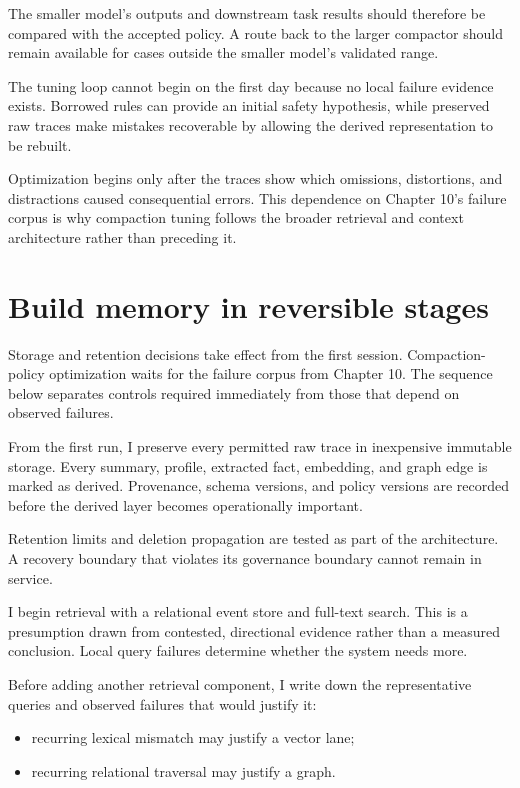 The smaller model's outputs and downstream task results should therefore be compared with the accepted policy. A route back to the larger compactor should remain available for cases outside the smaller model's validated range.

The tuning loop cannot begin on the first day because no local failure evidence exists. Borrowed rules can provide an initial safety hypothesis, while preserved raw traces make mistakes recoverable by allowing the derived representation to be rebuilt.

Optimization begins only after the traces show which omissions, distortions, and distractions caused consequential errors. This dependence on Chapter 10's failure corpus is why compaction tuning follows the broader retrieval and context architecture rather than preceding it.

\hypertarget{build-memory-in-reversible-stages}{%
\section{Build memory in reversible stages}\label{build-memory-in-reversible-stages}}

Storage and retention decisions take effect from the first session. Compaction-policy optimization waits for the failure corpus from Chapter 10. The sequence below separates controls required immediately from those that depend on observed failures.

From the first run, I preserve every permitted raw trace in inexpensive immutable storage. Every summary, profile, extracted fact, embedding, and graph edge is marked as derived. Provenance, schema versions, and policy versions are recorded before the derived layer becomes operationally important.

Retention limits and deletion propagation are tested as part of the architecture. A recovery boundary that violates its governance boundary cannot remain in service.

I begin retrieval with a relational event store and full-text search. This is a presumption drawn from contested, directional evidence rather than a measured conclusion. Local query failures determine whether the system needs more.


Before adding another retrieval component, I write down the representative queries and observed failures that would justify it:

\begin{itemize}
\tightlist
\item
  recurring lexical mismatch may justify a vector lane;
\item
  recurring relational traversal may justify a graph.
\end{itemize}

